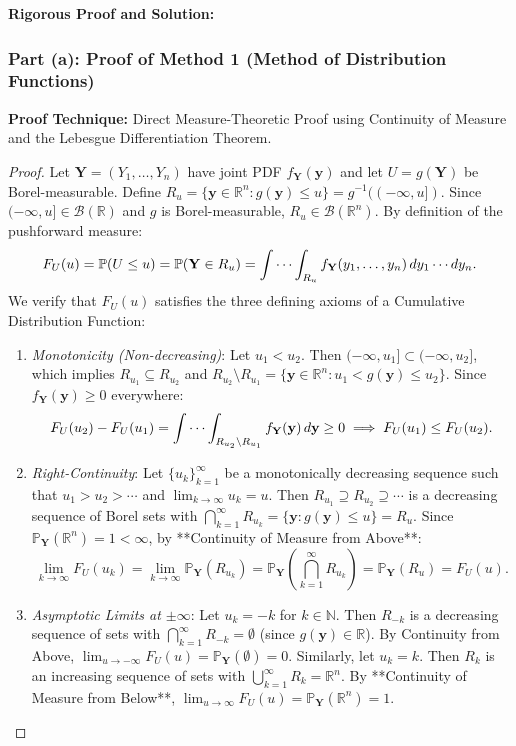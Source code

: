 \documentclass[11pt, letterpaper]{article}
\theoremstyle{definition}
\theoremstyle{remark}
\newcommand{\R}{\mathbb{R}}
\newcommand{\N}{\mathbb{N}}
\newcommand{\Prob}{\mathbb{P}}
\begin{document}
\hr
\textbf{Rigorous Proof and Solution:}

\subsubsection*{Part (a): Proof of Method 1 (Method of Distribution Functions)}
\textbf{Proof Technique:} Direct Measure-Theoretic Proof using Continuity of Measure and the Lebesgue Differentiation Theorem.

\begin{proof}
Let $\mathbf{Y} = (Y_1, \dots, Y_n)$ have joint PDF $f_{\mathbf{Y}}(\mathbf{y})$ and let $U = g(\mathbf{Y})$ be Borel-measurable. Define $R_u = \{\mathbf{y} \in \R^n : g(\mathbf{y}) \le u\} = g^{-1}((-\infty, u])$. Since $(-\infty, u] \in \mathcal{B}(\R)$ and $g$ is Borel-measurable, $R_u \in \mathcal{B}(\R^n)$. By definition of the pushforward measure:
\[
    F_U(u) = \Prob(U \le u) = \Prob(\mathbf{Y} \in R_u) = \idotsint_{R_u} f_{\mathbf{Y}}(y_1, \dots, y_n) \, dy_1 \cdots dy_n.
\]
We verify that $F_U(u)$ satisfies the three defining axioms of a Cumulative Distribution Function:
\begin{enumerate}[label=\textbf{Axiom \arabic*:}]
    \item \textit{Monotonicity (Non-decreasing)}: Let $u_1 < u_2$. Then $(-\infty, u_1] \subset (-\infty, u_2]$, which implies $R_{u_1} \subseteq R_{u_2}$ and $R_{u_2} \setminus R_{u_1} = \{\mathbf{y} \in \R^n : u_1 < g(\mathbf{y}) \le u_2\}$. Since $f_{\mathbf{Y}}(\mathbf{y}) \ge 0$ everywhere:
    \[
        F_U(u_2) - F_U(u_1) = \idotsint_{R_{u_2} \setminus R_{u_1}} f_{\mathbf{Y}}(\mathbf{y}) \, d\mathbf{y} \ge 0 \implies F_U(u_1) \le F_U(u_2).
    \]
    \item \textit{Right-Continuity}: Let $\{u_k\}_{k=1}^\infty$ be a monotonically decreasing sequence such that $u_1 > u_2 > \cdots$ and $\lim_{k\to\infty} u_k = u$. Then $R_{u_1} \supseteq R_{u_2} \supseteq \cdots$ is a decreasing sequence of Borel sets with $\bigcap_{k=1}^\infty R_{u_k} = \{\mathbf{y} : g(\mathbf{y}) \le u\} = R_u$. Since $\Prob_{\mathbf{Y}}(\R^n) = 1 < \infty$, by **Continuity of Measure from Above**:
    \[
        \lim_{k \to \infty} F_U(u_k) = \lim_{k \to \infty} \Prob_{\mathbf{Y}}(R_{u_k}) = \Prob_{\mathbf{Y}}\left(\bigcap_{k=1}^\infty R_{u_k}\right) = \Prob_{\mathbf{Y}}(R_u) = F_U(u).
    \]
    \item \textit{Asymptotic Limits at $\pm\infty$}: Let $u_k = -k$ for $k \in \N$. Then $R_{-k}$ is a decreasing sequence of sets with $\bigcap_{k=1}^\infty R_{-k} = \emptyset$ (since $g(\mathbf{y}) \in \R$). By Continuity from Above, $\lim_{u \to -\infty} F_U(u) = \Prob_{\mathbf{Y}}(\emptyset) = 0$. Similarly, let $u_k = k$. Then $R_k$ is an increasing sequence of sets with $\bigcup_{k=1}^\infty R_k = \R^n$. By **Continuity of Measure from Below**, $\lim_{u \to \infty} F_U(u) = \Prob_{\mathbf{Y}}(\R^n) = 1$.

\end{enumerate}
\end{proof}
\end{document}
